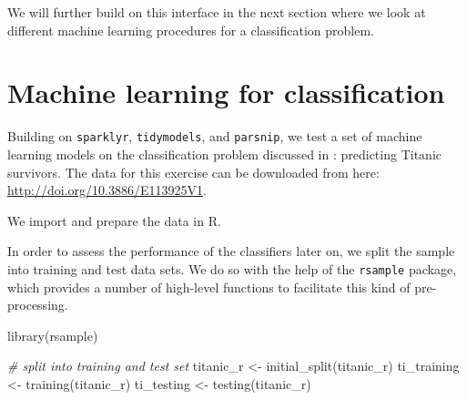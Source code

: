 \documentclass[
  12pt,
]{style/krantz}
\newenvironment{Shaded}{\begin{snugshade}}{\end{snugshade}}
\newcommand{\CommentTok}[1]{\textcolor[rgb]{0.56,0.35,0.01}{\textit{#1}}}
\newcommand{\DecValTok}[1]{\textcolor[rgb]{0.00,0.00,0.81}{#1}}
\newcommand{\FunctionTok}[1]{\textcolor[rgb]{0.00,0.00,0.00}{#1}}
\newcommand{\NormalTok}[1]{#1}
\newcommand{\OtherTok}[1]{\textcolor[rgb]{0.56,0.35,0.01}{#1}}
\newcommand{\SpecialCharTok}[1]{\textcolor[rgb]{0.00,0.00,0.00}{#1}}
\newcommand{\StringTok}[1]{\textcolor[rgb]{0.31,0.60,0.02}{#1}}
\begin{document}
We will further build on this interface in the next section where we look at different machine learning procedures for a classification problem.

\hypertarget{machine-learning-for-classification}{%
\section{Machine learning for classification}\label{machine-learning-for-classification}}

Building on \texttt{sparklyr}, \texttt{tidymodels}, and \texttt{parsnip}, we test a set of machine learning models on the classification problem discussed in \citet{varian_2014}: predicting Titanic survivors. The data for this exercise can be downloaded from here: \url{http://doi.org/10.3886/E113925V1}.

We import and prepare the data in R.

\begin{Shaded}
\end{Shaded}

In order to assess the performance of the classifiers later on, we split the sample into training and test data sets. We do so with the help of the \texttt{rsample} package, which provides a number of high-level functions to facilitate this kind of pre-processing.

\begin{Shaded}
\begin{Highlighting}[]
\FunctionTok{library}\NormalTok{(rsample)}

\CommentTok{\# split into training and test set}
\NormalTok{titanic\_r }\OtherTok{\textless{}{-}} \FunctionTok{initial\_split}\NormalTok{(titanic\_r)}
\NormalTok{ti\_training }\OtherTok{\textless{}{-}} \FunctionTok{training}\NormalTok{(titanic\_r)}
\NormalTok{ti\_testing }\OtherTok{\textless{}{-}} \FunctionTok{testing}\NormalTok{(titanic\_r)}
\end{Highlighting}
\end{Shaded}
\end{document}

